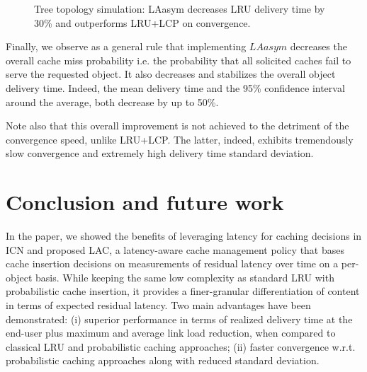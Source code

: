 \documentclass[conference]{IEEEtran}
\begin{document}
 \begin{figure*}[htbp] 
 \centering
 \caption{Tree topology simulation:  LAasym decreases LRU delivery time by 30\% and outperforms LRU+LCP on convergence.}
 \label{tree_topology_results}
 \end{figure*}
 
Finally, we observe as a general rule that implementing $LAasym$ decreases the
overall cache miss probability i.e. the probability that all solicited caches fail to serve the
requested object. It also decreases and stabilizes the overall object delivery time. Indeed, the mean delivery time and the 95\% confidence interval around the average, both decrease by up to 50\%. 

Note also that this overall improvement is not achieved to the detriment of the convergence speed, unlike LRU+LCP. The latter, indeed, exhibits tremendously slow convergence and extremely high delivery time standard deviation.

\section{Conclusion and future work}
\label{sec:conclusion}
In the paper, we showed the benefits of leveraging latency for caching decisions in ICN and proposed LAC, a latency-aware cache management policy that bases cache insertion decisions on measurements of residual latency over time on a per-object basis. 
While keeping the same low complexity as standard LRU with probabilistic cache insertion, it provides a finer-granular differentiation of content in terms of expected residual latency. 
Two main advantages have been demonstrated: (i) superior performance in terms of realized delivery time at the end-user plus maximum and average link load reduction, when compared to classical LRU and probabilistic caching approaches; (ii) faster convergence w.r.t. probabilistic caching approaches along with reduced standard deviation. 
\end{document}
